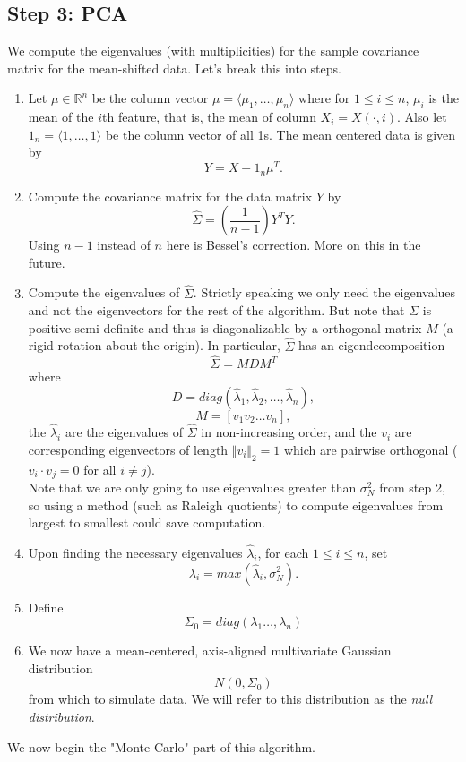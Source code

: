 \documentclass{article}
\begin{document}
\subsection{Step 3: PCA }
We compute the eigenvalues (with multiplicities) for the sample covariance matrix for the mean-shifted data.  Let's break this into steps.
\begin{enumerate}

\item
Let $\mu \in \mathbb{R}^{n}$ be the column vector $\mu = \langle \mu_{1}, \ldots, \mu_{n}\rangle$ where for $1\leq i \leq n$, $\mu_i$ is the mean of the $i$th feature, that is, the mean of column $X_i = X(\cdot, i)$.  
Also let $1_{n} = \langle1, \dots, 1 \rangle$ be the column vector of all 1s. The mean centered data is given by
$$Y = X - 1_{n} \mu^{T}.$$

\item Compute the covariance matrix for the data matrix $Y$ by 
$$\hat{\Sigma} = \left(\frac{1}{n-1}\right)Y^{T}Y.$$  Using $n-1$ instead of $n$ here is Bessel's correction.  More on this in the future.

\item Compute the eigenvalues of $\hat{\Sigma}$.  Strictly speaking we only need the eigenvalues and not the eigenvectors for the rest of the algorithm.  But note that $\Sigma$ is positive semi-definite and thus is diagonalizable by a orthogonal matrix $M$ (a rigid rotation about the origin).  In particular, $\hat{\Sigma}$ has an eigendecomposition
$$ \hat{\Sigma} = MDM^{T}$$ where 
$$D = diag(\hat{\lambda}_{1}, \hat{\lambda}_{2}, \ldots, \hat{\lambda}_{n}),$$
$$M = [v_1 v_2 \ldots v_n],$$
the $\hat{\lambda}_{i}$ are the eigenvalues of $\hat{\Sigma}$ in non-increasing order, and the $v_i$ are corresponding eigenvectors of length $\Vert v_{i} \Vert_{2} = 1$ which are pairwise orthogonal ($v_i \cdot v_j = 0$ for all $i\neq j$).\\
\indent Note that we are only going to use eigenvalues greater than $\sigma^2_{N}$ from step 2, so using a method (such as Raleigh quotients) to compute eigenvalues from largest to smallest could save computation.

\item Upon finding the necessary eigenvalues $\hat{\lambda}_{i}$, for each $1\leq i \leq n$, set $$\lambda_{i} = max(\hat{\lambda}_{i}, \sigma_{N}^{2}).$$

\item Define $$\Sigma_{0} = diag(\lambda_{1}\ldots, \lambda_{n})$$

\item We now have a mean-centered, axis-aligned multivariate Gaussian distribution $$N(0, \Sigma_{0})$$ from which to simulate data. We will refer to this distribution as the \emph{null distribution}.

\end{enumerate}
We now begin the "Monte Carlo" part of this algorithm.
\end{document}
